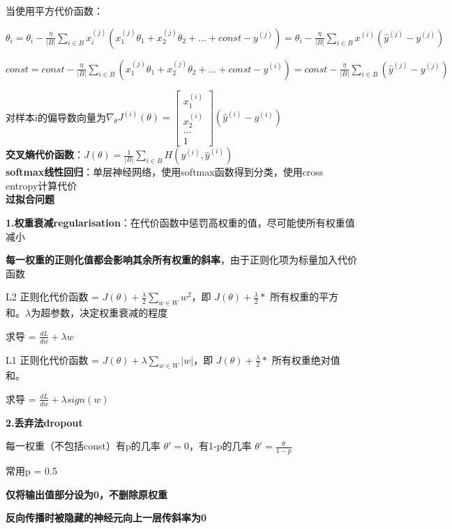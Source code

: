 \documentclass[UTF8]{ctexart}
\begin{document}
  当使用平方代价函数：
  
  \quad $\theta_i = \theta_i - \frac{\eta}{|B|}\sum_{i\in B} x^{(j)}_i(x^{(j)}_1\theta_1 + x^{(j)}_2\theta_2 + ... + const - y^{(j)}) = \theta_i - \frac{\eta}{|B|}\sum_{i\in B}x^{(i)}(\hat{y}^{(j)} - y^{(j)})$

  \quad $const = const - \frac{\eta}{|B|}\sum_{i\in B} (x^{(j)}_1\theta_1 + x^{(j)}_2\theta_2 + ... + const - y^{(i)}) = const - \frac{\eta}{|B|}\sum_{i\in B}(\hat{y}^{(j)} - y^{(j)})$

  \quad 对样本i的偏导数向量为$\nabla _{\theta}J^{(i)}(\theta) = 
    \begin{bmatrix}
    x^{(i)}_1 \\
    x^{(i)}_2 \\
    ... \\
    1
    \end{bmatrix}(\hat{y}^{(i)} - y^{(i)})
    $\\
\textbf{交叉熵代价函数}：$J(\theta) = \frac{1}{|B|}\sum_{i\in B} H(y^{(i)}, \hat{y}^{(i)})$\\
\textbf{softmax线性回归}：单层神经网络，使用softmax函数得到分类，使用cross entropy计算代价\\
\textbf{过拟合问题}

  \textbf{1.权重衰减regularisation}：在代价函数中惩罚高权重的值，尽可能使所有权重值减小

  \quad \textbf{每一权重的正则化值都会影响其余所有权重的斜率}，由于正则化项为标量加入代价函数

  \quad L2 正则化代价函数 = $J(\theta) + \frac{\lambda}{2}\sum_{w\in W}w^2$，即 $J(\theta) + \frac{\lambda}{2} * $ 所有权重的平方和。$\lambda$为超参数，决定权重衰减的程度

  \quad \quad 求导 = $\frac{dL}{dw} + \lambda w$
  
  \quad L1 正则化代价函数 = $J(\theta) + \lambda \sum_{w\in W} |w|$，即 $J(\theta) + \frac{\lambda}{2} * $ 所有权重绝对值和。

  \quad \quad 求导 = $\frac{dL}{dw} + \lambda sign(w)$

  \textbf{2.丢弃法dropout}

  \quad 每一权重（不包括const）有p的几率 $\theta' = 0$，有1-p的几率 $\theta' = \frac{\theta}{1-p}$

  \quad \quad 常用p = 0.5

  \quad \quad \textbf{仅将输出值部分设为0，不删除原权重}

  \quad \quad \textbf{反向传播时被隐藏的神经元向上一层传斜率为0}
\end{document}
